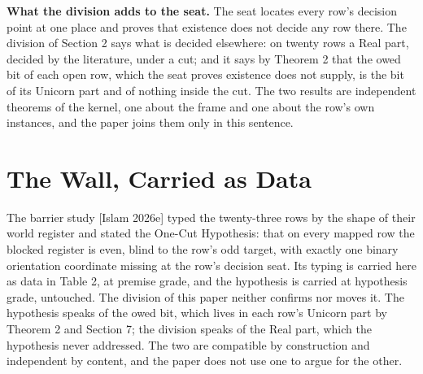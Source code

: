 \documentclass[10pt]{article}
\begin{document}
\textbf{What the division adds to the seat.} The seat locates every
row's decision point at one place and proves that existence does not
decide any row there. The division of Section 2 says what is decided
elsewhere: on twenty rows a Real part, decided by the literature, under
a cut; and it says by Theorem 2 that the owed bit of each open row,
which the seat proves existence does not supply, is the bit of its
Unicorn part and of nothing inside the cut. The two results are
independent theorems of the kernel, one about the frame and one about
the row's own instances, and the paper joins them only in this sentence.

\hypertarget{the-wall-carried-as-data}{%
\section{The Wall, Carried as Data}\label{the-wall-carried-as-data}}

The barrier study {[}Islam 2026e{]} typed the twenty-three rows by the
shape of their world register and stated the One-Cut Hypothesis: that on
every mapped row the blocked register is even, blind to the row's odd
target, with exactly one binary orientation coordinate missing at the
row's decision seat. Its typing is carried here as data in Table 2, at
premise grade, and the hypothesis is carried at hypothesis grade,
untouched. The division of this paper neither confirms nor moves it. The
hypothesis speaks of the owed bit, which lives in each row's Unicorn
part by Theorem 2 and Section 7; the division speaks of the Real part,
which the hypothesis never addressed. The two are compatible by
construction and independent by content, and the paper does not use one
to argue for the other.
\end{document}
